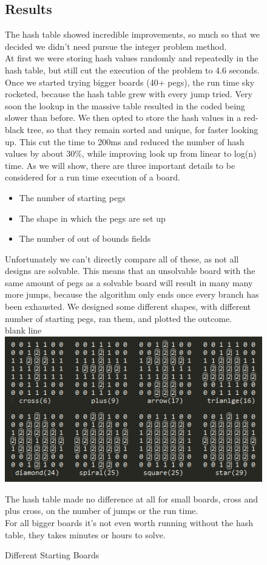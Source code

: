 \documentclass[11pt]{article}
\begin{document}
\newpage
\begin{figure}
\subsection{Results}
The hash table showed incredible improvements, so much so that we decided we didn't need pursue the integer problem method.\\
At first we were storing hash values randomly and repeatedly in the hash table, but still cut the execution of the problem to 4.6 seconds. Once we started trying bigger boards (40+ pegs), the run time sky rocketed, because the hash table grew with every jump tried. Very soon the lookup in the massive table resulted in the coded being slower than before.
We then opted to store the hash values in a red-black tree, so that they remain sorted and unique, for faster looking up.
This cut the time to 200ms and reduced the number of hash values by about 30\%, while improving look up from linear to log(n) time.\newline
As we will show, there are three important details to be considered for a run time execution of a board.
\begin{itemize}
\item The number of starting pegs
\item The shape in which the pegs are set up
\item The number of out of bounds fields
\end{itemize}
Unfortunately we can't directly compare all of these, as not all designs are solvable. This means that an unsolvable board with the same amount of pegs as a solvable board will result in many many more jumps, because the algorithm only ends once every branch has been exhausted.\newline
We designed some different shapes, with different number of starting pegs, ran them, and plotted the outcome.\\
\color{white} blank line\\
\color{black}
\includegraphics[width=12cm]{5}
\caption{Different Starting Boards} 
\label{fig: 5}
The hash table made no difference at all for small boards, cross and plus cross, on the number of jumps or the run time.\\
For all bigger boards it's not even worth running without the hash table, they takes minutes or hours to solve.\\
\end{figure}
\newpage
\end{document}
